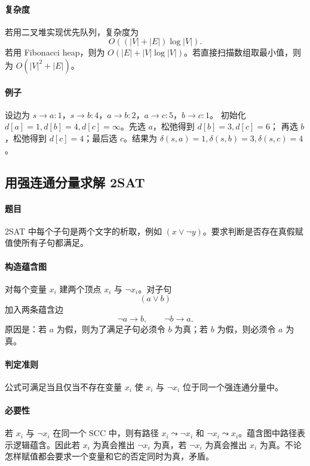 \documentclass[UTF8,openany,12pt]{ctexbook}
\theoremstyle{remark}
\begin{document}
\paragraph{复杂度}
若用二叉堆实现优先队列，复杂度为
\[
  O((|V|+|E|)\log |V|).
\]
若用 Fibonacci heap，则为 $O(|E|+|V|\log |V|)$。若直接扫描数组取最小值，则为
$O(|V|^2+|E|)$。

\paragraph{例子}
设边为 $s\to a:1$，$s\to b:4$，$a\to b:2$，$a\to c:5$，$b\to c:1$。
初始化 $d[a]=1,d[b]=4,d[c]=\infty$。先选 $a$，松弛得到 $d[b]=3,d[c]=6$；
再选 $b$，松弛得到 $d[c]=4$；最后选 $c$。结果为
$\delta(s,a)=1,\delta(s,b)=3,\delta(s,c)=4$。

\subsection{用强连通分量求解 2SAT}

\paragraph{题目}
2SAT 中每个子句是两个文字的析取，例如 $(x\vee \neg y)$。要求判断是否存在真假赋值使所有子句都满足。

\paragraph{构造蕴含图}
对每个变量 $x_i$ 建两个顶点 $x_i$ 与 $\neg x_i$。对子句
\[
  (a\vee b)
\]
加入两条蕴含边
\[
  \neg a\to b,\qquad \neg b\to a.
\]
原因是：若 $a$ 为假，则为了满足子句必须令 $b$ 为真；若 $b$ 为假，则必须令 $a$ 为真。

\paragraph{判定准则}
公式可满足当且仅当不存在变量 $x_i$ 使 $x_i$ 与 $\neg x_i$ 位于同一个强连通分量中。

\paragraph{必要性}
若 $x_i$ 与 $\neg x_i$ 在同一个 SCC 中，则有路径 $x_i\leadsto \neg x_i$ 和
$\neg x_i\leadsto x_i$。蕴含图中路径表示逻辑蕴含。因此若 $x_i$ 为真会推出
$\neg x_i$ 为真，若 $\neg x_i$ 为真会推出 $x_i$ 为真。不论怎样赋值都会要求一个变量和它的否定同时为真，矛盾。
\end{document}
